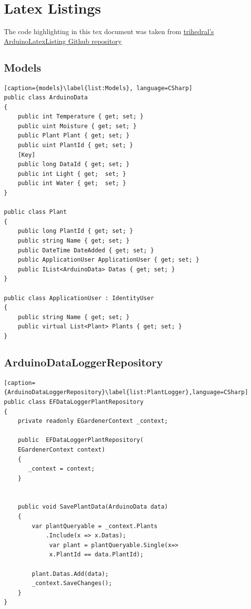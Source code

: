 \documentclass[a4paper,12pt,twoside,openright,titlepage]{book}
\begin{document}
\chapter{Latex Listings}
The code highlighting in this tex document was taken from \href{https://github.com/trihedral/ArduinoLatexListing/blob/master/arduinoLanguage.tex}{trihedral's ArduinoLatexListing Github repository}

\section{Models}
\begin{lstlisting}[caption={models}\label{list:Models}, language=CSharp]
public class ArduinoData
{
	public int Temperature { get; set; }
	public uint Moisture { get; set; }
	public Plant Plant { get; set; }
	public uint PlantId { get; set; }
	[Key]
    public long DataId { get; set; }
	public int Light { get;  set; }
	public int Water { get;  set; }
}

public class Plant
{
	public long PlantId { get; set; }
    public string Name { get; set; }
	public DateTime DateAdded { get; set; }
	public ApplicationUser ApplicationUser { get; set; }
	public IList<ArduinoData> Datas { get; set; }
}

public class ApplicationUser : IdentityUser
{
	public string Name { get; set; }
	public virtual List<Plant> Plants { get; set; }  
}
\end{lstlisting}

\section{ArduinoDataLoggerRepository}
\begin{lstlisting}[caption={ArduinoDataLoggerRepository}\label{list:PlantLogger},language=CSharp]
public class EFDataLoggerPlantRepository
{
	private readonly EGardenerContext _context;

	public	EFDataLoggerPlantRepository(
	EGardenerContext context)
	{
       _context = context;
	}


	public void SavePlantData(ArduinoData data)
	{
		var plantQueryable = _context.Plants
			.Include(x => x.Datas);
             var plant = plantQueryable.Single(x=>
             x.PlantId == data.PlantId);
             
		plant.Datas.Add(data);
		_context.SaveChanges();
	}
}
\end{lstlisting}
\end{document}

